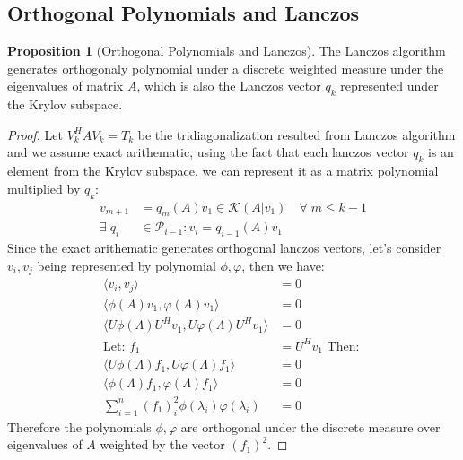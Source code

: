 \documentclass[]{article}
\theoremstyle{definition}
\newtheorem{prop}{Proposition}[section]  %
\begin{document}
\begin{appendices}
        \subsection{Orthogonal Polynomials and Lanczos}
            \begin{prop}[Orthogonal Polynomials and Lanczos]\label{prop:Orthogonal_Polynomials_and_Lanczos}
                The Lanczos algorithm generates orthogonaly polynomial under a discrete weighted measure under the eigenvalues of matrix $A$, which is also the Lanczos vector $q_k$ represented under the Krylov subspace. 
            \end{prop}
            \begin{proof}
                Let $V_k^HAV_k = T_k$ be the tridiagonalization resulted from Lanczos algorithm and we assume exact arithematic, using the fact that each lanczos vector $q_k$ is an element from the Krylov subspace, we can represent it as a matrix polynomial multiplied by $q_k$: 
                \begin{align}
                    v_{m + 1} &= q_{m}(A)v_1 \in \mathcal{K}(A|v_1) \quad \forall\; m \le k - 1
                    \\
                    \exists\; q_{i} &\in \mathcal{P}_{i - 1}: v_i = q_{i - 1}(A) v_1
            \end{align}
            Since the exact arithematic generates orthogonal lanczos vectors, let's consider $v_i, v_j$ being represented by polynomial $\phi, \varphi$, then we have:
            \begin{align}
                \langle v_i, v_j\rangle &= 0 
                \\
                \langle\phi(A)v_1, \varphi(A)v_1 \rangle &= 0
                \\
                \langle U\phi(\Lambda)U^Hv_1, U\varphi(\Lambda)U^Hv_1\rangle &= 0
                \\
                \text{Let: }f_1 &= U^Hv_1 \text{ Then: }
                \\
                \langle U\phi(\Lambda)f_1, U\varphi(\Lambda)f_1\rangle &= 0
                \\
                \langle \phi(\Lambda)f_1, \varphi(\Lambda)f_1\rangle &= 0
                \\
                \sum_{i = 1}^{n} (f_1)_i^2\phi(\lambda_i)\varphi(\lambda_i) &= 0
            \end{align}
            Therefore the polynomials $\phi, \varphi$ are orthogonal under the discrete measure over eigenvalues of $A$ weighted by the vector $(f_1)^2$. 
        \end{proof}

\end{appendices}
\end{document}
